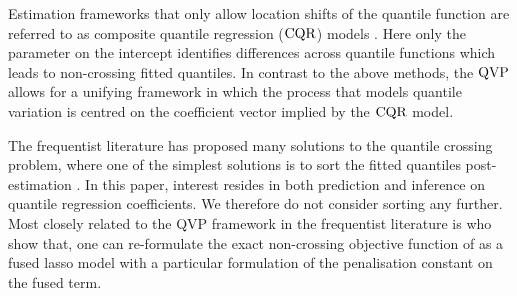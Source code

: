 Estimation frameworks that only allow location shifts of the quantile function are referred to as composite quantile regression ($\operatorname{CQR}$) models \citep{zou2008composite}. Here only the parameter on the intercept identifies differences across quantile functions which leads to non-crossing fitted quantiles. In contrast to the above methods, the $\operatorname{QVP}$ allows for a unifying framework in which the process that models quantile variation is centred on the coefficient vector implied by the $\operatorname{CQR}$ model.    

The frequentist literature has proposed many solutions to the quantile crossing problem, where one of the simplest solutions is to sort the fitted quantiles post-estimation \citep{chernozhukov2010quantile}. 
In this paper, interest resides in both prediction and inference on  quantile regression coefficients. We therefore do not consider sorting any further.
Most closely related to the QVP framework in the frequentist literature is \citet{szendrei2023fused} who show that, one can re-formulate the exact non-crossing objective function of \citet{bondell2010noncrossing} as a fused lasso model with a particular formulation of the penalisation constant on the fused term.



